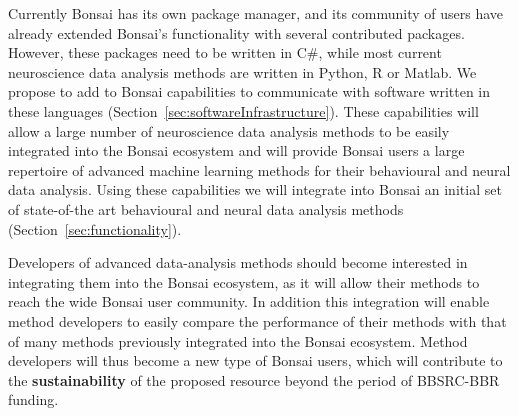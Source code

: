 Currently Bonsai has its own package manager, and its community of users have
already extended Bonsai's functionality with several contributed packages.
%
However, these packages need to
be written in C\#, while most current neuroscience data analysis methods are
written in Python, R or Matlab. We propose to add to Bonsai capabilities to
communicate with software written in these languages
(Section~\ref{sec:softwareInfrastructure}).  These capabilities will allow a
large number of neuroscience data analysis methods to be easily integrated into
the Bonsai ecosystem and will provide Bonsai users a large repertoire of
advanced machine learning methods for their behavioural and neural data
analysis.
%
Using these capabilities we will integrate into Bonsai an initial set of
state-of-the art behavioural and neural data analysis methods
(Section~\ref{sec:functionality}).

Developers of advanced data-analysis methods should become interested in
integrating them into the Bonsai ecosystem, as it will allow their methods to
reach the wide Bonsai user community. In addition this integration will enable
method developers to easily compare the performance of their methods with
that of many methods previously integrated into the Bonsai ecosystem. Method
developers will thus become a new type of Bonsai users, which will contribute
to the \textbf{sustainability} of the proposed resource beyond the period of
BBSRC-BBR funding.


